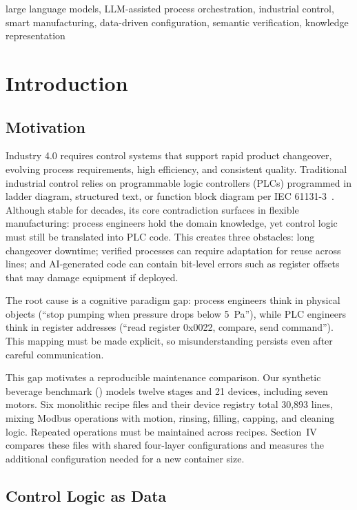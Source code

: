 \documentclass[conference]{IEEEtran}
\begin{document}
\begin{IEEEkeywords}
large language models, LLM-assisted process orchestration, industrial control, smart manufacturing, data-driven configuration, semantic verification, knowledge representation
\end{IEEEkeywords}

\section{Introduction}

\subsection{Motivation}

Industry 4.0 requires control systems that support rapid product changeover, evolving process requirements, high efficiency, and consistent quality. Traditional industrial control relies on programmable logic controllers (PLCs) programmed in ladder diagram, structured text, or function block diagram per IEC 61131-3~\cite{iec61131}. Although stable for decades, its core contradiction surfaces in flexible manufacturing: process engineers hold the domain knowledge, yet control logic must still be translated into PLC code. This creates three obstacles: long changeover downtime; verified processes can require adaptation for reuse across lines; and AI-generated code can contain bit-level errors such as register offsets that may damage equipment if deployed.

The root cause is a cognitive paradigm gap: process engineers think in physical objects (``stop pumping when pressure drops below 5~Pa''), while PLC engineers think in register addresses (``read register 0x0022, compare, send command''). This mapping must be made explicit, so misunderstanding persists even after careful communication.

This gap motivates a reproducible maintenance comparison. Our synthetic beverage benchmark () models twelve stages and 21 devices, including seven motors. Six monolithic recipe files and their device registry total 30,893 lines, mixing Modbus operations with motion, rinsing, filling, capping, and cleaning logic. Repeated operations must be maintained across recipes. Section~IV compares these files with shared four-layer configurations and measures the additional configuration needed for a new container size.

\subsection{Control Logic as Data}
\end{document}
